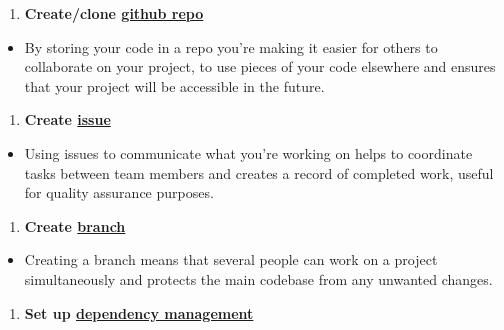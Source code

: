 \documentclass[]{book}
\providecommand{\tightlist}{%
  \setlength{\itemsep}{0pt}\setlength{\parskip}{0pt}}
\begin{document}
\begin{enumerate}
\def\labelenumi{\arabic{enumi}.}
\tightlist
\item
  \textbf{Create/clone \protect\hyperlink{versioncontrol}{github repo}}\\
\end{enumerate}

\begin{itemize}
\tightlist
\item
  By storing your code in a repo you're making it easier for others to collaborate on your project, to use pieces of your code elsewhere and ensures that your project will be accessible in the future.
\end{itemize}

\begin{enumerate}
\def\labelenumi{\arabic{enumi}.}
\setcounter{enumi}{1}
\tightlist
\item
  \textbf{Create \protect\hyperlink{versioncontrol}{issue}}\\
\end{enumerate}

\begin{itemize}
\tightlist
\item
  Using issues to communicate what you're working on helps to coordinate tasks between team members and creates a record of completed work, useful for quality assurance purposes.
\end{itemize}

\begin{enumerate}
\def\labelenumi{\arabic{enumi}.}
\setcounter{enumi}{2}
\tightlist
\item
  \textbf{Create \protect\hyperlink{versioncontrol}{branch}}\\
\end{enumerate}

\begin{itemize}
\tightlist
\item
  Creating a branch means that several people can work on a project simultaneously and protects the main codebase from any unwanted changes.\\
\end{itemize}

\begin{enumerate}
\def\labelenumi{\arabic{enumi}.}
\setcounter{enumi}{3}
\tightlist
\item
  \textbf{Set up \protect\hyperlink{projdep}{dependency management}}\\
\end{enumerate}
\end{document}

